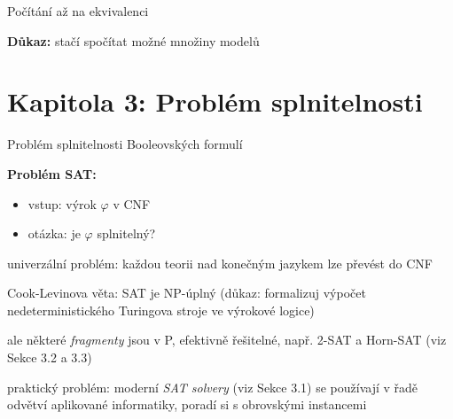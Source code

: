 \documentclass{beamer}
\begin{document}
\begin{frame}{Počítání až na ekvivalenci}


    \textbf{Důkaz:} stačí spočítat možné množiny modelů\hfill\qedsymbol
        
\end{frame}


\section{\sc Kapitola 3: Problém splnitelnosti}


\begin{frame}{Problém splnitelnosti Booleovských formulí}
   
    \textbf{Problém SAT:}
    \begin{itemize}
        \item vstup: výrok $\varphi$ v CNF
        \item otázka: je $\varphi$ splnitelný? 
    \end{itemize}

    \pause
    \alert{univerzální problém}: každou teorii nad konečným jazykem lze převést do CNF

    \pause
    \alert{Cook-Levinova věta}: SAT je NP-úplný (důkaz: formalizuj výpočet nedeterministického Turingova stroje ve výrokové logice)

    \pause
    ale některé \emph{fragmenty} jsou v P, efektivně řešitelné, např. 2-SAT a Horn-SAT (viz Sekce 3.2 a 3.3)

    \pause
    \alert{praktický problém}: moderní \emph{SAT solvery} (viz Sekce 3.1) se používají v řadě odvětví aplikované informatiky, poradí si s obrovskými instancemi
    
\end{frame}
\end{document}
